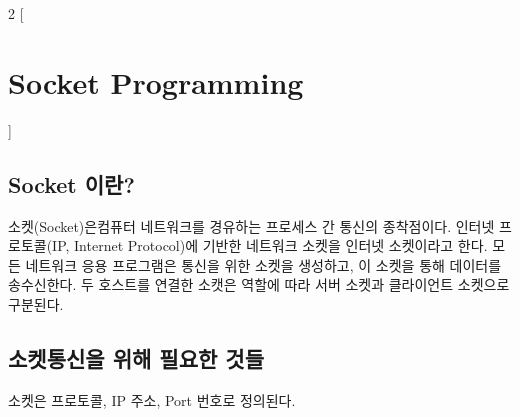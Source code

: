 \begin{multicols}{2}
[
\section{Socket Programming}
]
\subsection{Socket 이란?}
    소켓(Socket)은컴퓨터 네트워크를 경유하는 프로세스 간 통신의 종착점이다. 인터넷 프로토콜(IP, Internet Protocol)에 기반한 네트워크 소켓을 인터넷 소켓이라고 한다. 모든 네트워크 응용 프로그램은 통신을 위한 소켓을 생성하고, 이 소켓을 통해 데이터를 송수신한다. 두 호스트를 연결한 소캣은 역할에 따라 서버 소켓과 클라이언트 소켓으로 구분된다. 
\vspace{-3mm}
    \begin{figure}[h!]
    \centering
    \hfill
    \end{figure}
\vspace{-3mm}
\subsection{소켓통신을 위해 필요한 것들}    
    소켓은 프로토콜, IP 주소, Port 번호로 정의된다.
    

\end{multicols}
